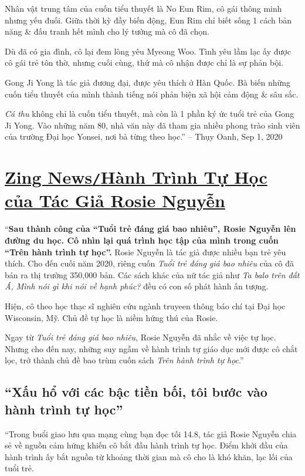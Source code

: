 \documentclass[oneside]{book}
\numberwithin{equation}{section}
\begin{document}
Nhân vật trung tâm của cuốn tiểu thuyết là No Eun Rim, cô gái thông minh nhưng yếu đuối. Giữa thời kỳ đầy biến động, Eun Rim chỉ biết sống 1 cách bản năng \& đấu tranh hết mình cho lý tưởng mà cô đã chọn.

Dù đã có gia đình, cô lại đem lòng yêu Myeong Woo. Tình yêu lầm lạc ấy được cô gái trẻ tôn thờ, nhưng cuối cùng, thứ mà cô nhận được chỉ là sự phản bội.

Gong Ji Yong là tác giả đương đại, được yêu thích ở Hàn Quốc. Bà biến những cuốn tiểu thuyết của mình thành tiếng nói phản biện xã hội cảm động \& sâu sắc.

\textit{Cá thu} không chỉ là cuốn tiểu thuyết, mà còn là 1 phần ký ức tuổi trẻ của Gong Ji Yong. Vào những năm 80, nhà văn này đã tham gia nhiều phong trào sinh viên của trường Đại học Yonsei, nơi bà từng theo học.'' -- Thụy Oanh, Sep 1, 2020


\section{\href{https://zingnews.vn/hanh-trinh-tu-hoc-cua-tac-gia-rosie-nguyen-post1251308.html}{Zing News\texttt{/}Hành Trình Tự Học của Tác Giả Rosie Nguyễn}}
``\textbf{Sau thành công của ``Tuổi trẻ đáng giá bao nhiêu'', Rosie Nguyễn lên đường du học. Cô nhìn lại quá trình học tập của mình trong cuốn ``Trên hành trình tự học''.} Rosie Nguyễn là tác giả được nhiều bạn trẻ yêu thích. Cho đến cuối năm 2020, riêng cuốn \textit{Tuổi trẻ đáng giá bao nhiêu} của cô đã bán ra thị trường 350,000 bản. Các sách khác của nữ tác giả như \textit{Ta balo trên đất Á, Mình nói gì khi nói về hạnh phúc?} đều có con số phát hành ấn tượng.

Hiện, cô theo học thạc sĩ nghiên cứu ngành truyeen thông báo chí tại Đại học Wisconsin, Mỹ. Chủ đề tự học là niềm hứng thú của Rosie.

Ngay từ \textit{Tuổi trẻ đáng giá bao nhiêu}, Rosie Nguyễn đã nhắc về việc tự học. Nhưng cho đến nay, những suy ngẫm về hành trình tự giáo dục mới được cô chắt lọc, trở thành chủ đề bao trùm cuốn sách \textit{Trên hành trình tự học}.''

\subsection{``Xấu hổ với các bậc tiền bối, tôi bước vào hành trình tự học''}
``Trong buổi giao lưu qua mạng cùng bạn đọc tối 14.8, tác giả Rosie Nguyễn chia sẻ về nguồn cảm hứng khiến cô bắt đầu hành trình tự học. Điểm khởi đầu của hành trình ấy bắt nguồn từ khoảng thời gian mà cô cho là khó khăn, lạc lối của tuổi trẻ.
\end{document}
